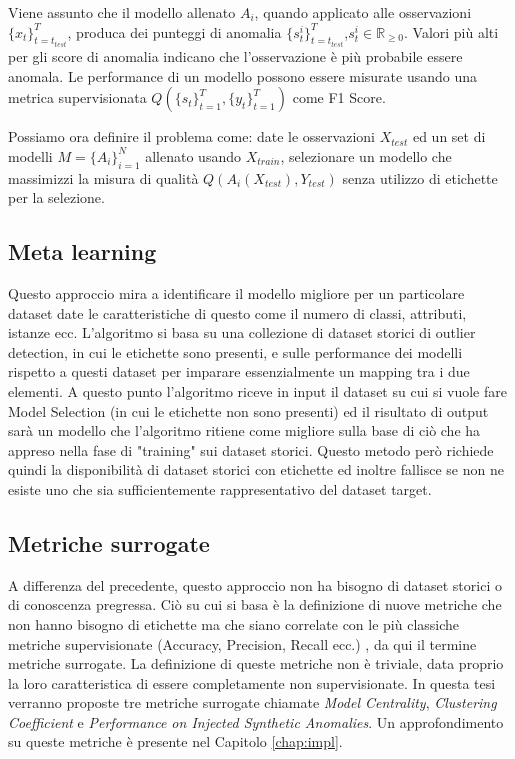 Viene assunto che il modello allenato \(A_i\), quando applicato alle osservazioni \(\{x_t\}^{T}_{t=t_{test}}\), produca dei punteggi di anomalia \(\{s_t^i\}_{t=t_{test}}^T\),\(s^i_t\in\mathbb{R}_{\geq0}\). Valori più alti per gli score di anomalia indicano che l'osservazione è più probabile essere anomala.
Le performance di un modello possono essere misurate usando una metrica supervisionata \(Q(\{s_t\}^T_{t=1},\{y_t\}^T_{t=1})\) come F1 Score.

Possiamo ora definire il problema come: date le osservazioni \(X_{test}\) ed un set di modelli \(M=\{A_i\}^N_{i=1}\) allenato usando \(X_{train}\), selezionare un modello che massimizzi la misura di qualità \(Q(A_i(X_{test}),Y_{test})\) senza utilizzo di etichette per la selezione.

\subsection{Meta learning}
Questo approccio mira a identificare il modello migliore per un particolare dataset date le caratteristiche di questo come il numero di classi, attributi, istanze ecc. L'algoritmo si basa su una collezione di dataset storici di outlier detection, in cui le etichette sono presenti, e sulle performance dei modelli rispetto a questi dataset per imparare essenzialmente un mapping tra i due elementi. 
A questo punto l'algoritmo riceve in input il dataset su cui si vuole fare Model Selection (in cui le etichette non sono presenti) ed il risultato di output sarà un modello che l'algoritmo ritiene come migliore sulla base di ciò che ha appreso nella fase di "training" sui dataset storici.
Questo metodo però richiede quindi la disponibilità di dataset storici con etichette ed inoltre fallisce se non ne esiste uno che sia sufficientemente rappresentativo del dataset target.
\subsection{Metriche surrogate}
A differenza del precedente, questo approccio non ha bisogno di dataset storici o di conoscenza pregressa. Ciò su cui si basa è la definizione di nuove metriche che non hanno bisogno di etichette ma che siano correlate con le più classiche metriche supervisionate (Accuracy, Precision, Recall ecc.) \cite{DBLP:journals/corr/abs-2104-01422}, da qui il termine metriche surrogate.
La definizione di queste metriche non è triviale, data proprio la loro caratteristica di essere completamente non supervisionate. In questa tesi verranno proposte tre metriche surrogate chiamate \textit{Model Centrality}, \textit{Clustering Coefficient} e \textit{Performance on Injected Synthetic Anomalies}. Un approfondimento su queste metriche è presente nel Capitolo \ref{chap:impl}.


